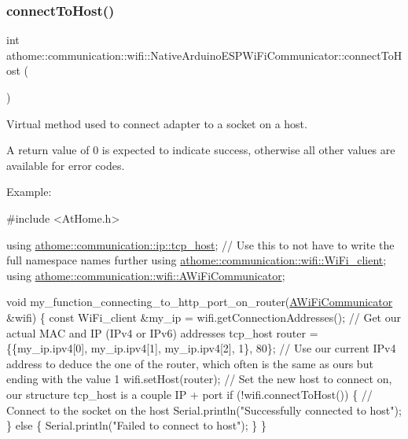 \subsubsection{\texorpdfstring{connect\+To\+Host()}{connectToHost()}}
{\footnotesize\ttfamily int athome\+::communication\+::wifi\+::\+Native\+Arduino\+E\+S\+P\+Wi\+Fi\+Communicator\+::connect\+To\+Host (\begin{DoxyParamCaption}{ }\end{DoxyParamCaption})\hspace{0.3cm}{\ttfamily [virtual]}}

Virtual method used to connect adapter to a socket on a host.

A return value of 0 is expected to indicate success, otherwise all other values are available for error codes.

Example\+:


\begin{DoxyCode}
\textcolor{preprocessor}{#include <AtHome.h>}

\textcolor{keyword}{using} \mbox{\hyperlink{structathome_1_1communication_1_1ip_1_1s__host}{athome::communication::ip::tcp\_host}}; \textcolor{comment}{// Use this to not have to
       write the full namespace names further}
\textcolor{keyword}{using} \mbox{\hyperlink{structathome_1_1communication_1_1wifi_1_1s__wifi__client}{athome::communication::wifi::WiFi\_client}};
\textcolor{keyword}{using} \mbox{\hyperlink{classathome_1_1communication_1_1wifi_1_1_a_wi_fi_communicator}{athome::communication::wifi::AWiFiCommunicator}};

\textcolor{keywordtype}{void} my\_function\_connecting\_to\_http\_port\_on\_router(\mbox{\hyperlink{classathome_1_1communication_1_1wifi_1_1_a_wi_fi_communicator_a0098148fe8d0eeee99b7f8f72a72a900}{AWiFiCommunicator}} &wifi) \{
  \textcolor{keyword}{const} WiFi\_client &my\_ip = wifi.getConnectionAddresses(); \textcolor{comment}{// Get our actual MAC and IP (IPv4 or IPv6)
       addresses}
  tcp\_host router = \{\{my\_ip.ipv4[0], my\_ip.ipv4[1], my\_ip.ipv4[2], 1\}, 80\}; \textcolor{comment}{// Use our current IPv4 address
       to deduce the one of the router, which often is the same as ours but ending with the value 1}
  wifi.setHost(router); \textcolor{comment}{// Set the new host to connect on, our structure tcp\_host is a couple IP + port}
  \textcolor{keywordflow}{if} (!wifi.connectToHost()) \{ \textcolor{comment}{// Connect to the socket on the host}
    Serial.println(\textcolor{stringliteral}{"Successfully connected to host"});
  \} \textcolor{keywordflow}{else} \{
    Serial.println(\textcolor{stringliteral}{"Failed to connect to host"});
  \}
\}
\end{DoxyCode}
 

